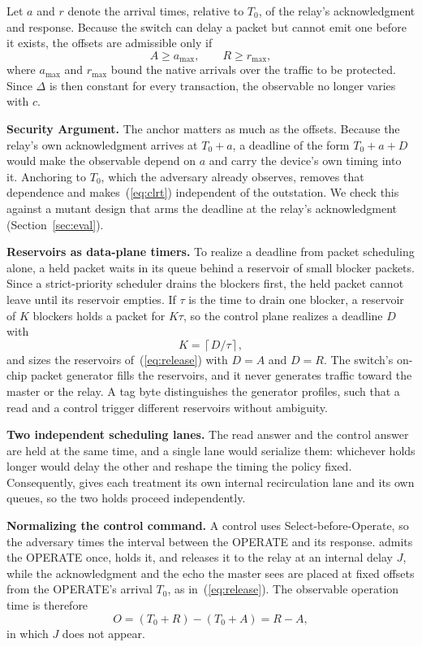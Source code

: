 Let $a$ and $r$ denote the arrival times, relative to $T_0$, of the relay's acknowledgment and
response. Because the switch can delay a packet but cannot emit one before it exists, the offsets are
admissible only if
\begin{equation}
\label{eq:admissible}
A \ge a_{\max}, \qquad R \ge r_{\max} ,
\end{equation}
where $a_{\max}$ and $r_{\max}$ bound the native arrivals over the traffic to be protected. Since
$\Delta$ is then constant for every transaction, the observable no longer varies with $c$.

\textbf{Security Argument.} The anchor matters as much as the offsets. Because the relay's own
acknowledgment arrives at $T_0+a$, a deadline of the form $T_0+a+D$ would make the observable depend on
$a$ and carry the device's own timing into it. Anchoring to $T_0$, which the adversary already
observes, removes that dependence and makes~(\ref{eq:clrt}) independent of the outstation. We check
this against a mutant design that arms the deadline at the relay's acknowledgment
(Section~\ref{sec:eval}).

\textbf{Reservoirs as data-plane timers.} To realize a deadline from packet scheduling alone, a held
packet waits in its queue behind a reservoir of small blocker packets. Since a strict-priority
scheduler drains the blockers first, the held packet cannot leave until its reservoir empties. If
$\tau$ is the time to drain one blocker, a reservoir of $K$ blockers holds a packet for $K\tau$, so the
control plane realizes a deadline $D$ with
\begin{equation}
\label{eq:reservoir}
K = \left\lceil D / \tau \right\rceil ,
\end{equation}
and sizes the reservoirs of~(\ref{eq:release}) with $D = A$ and $D = R$. The switch's on-chip packet generator fills
the reservoirs, and it never generates traffic toward the master or the relay. A tag byte distinguishes
the generator profiles, such that a read and a control trigger different reservoirs without ambiguity.

\textbf{Two independent scheduling lanes.} The read answer and the control answer are held at the same
time, and a single lane would serialize them: whichever holds longer would delay the other and reshape
the timing the policy fixed. Consequently, \sysname gives each treatment its own internal
recirculation lane and its own queues, so the two holds proceed independently.

\textbf{Normalizing the control command.} A control uses Select-before-Operate, so the adversary times
the interval between the OPERATE and its response. \sysname admits the OPERATE once, holds it, and
releases it to the relay at an internal delay $J$, while the acknowledgment and the echo the master
sees are placed at fixed offsets from the OPERATE's arrival $T_0$, as in~(\ref{eq:release}). The
observable operation time is therefore
\begin{equation}
\label{eq:optime}
O = (T_0 + R) - (T_0 + A) = R - A ,
\end{equation}
in which $J$ does not appear.

